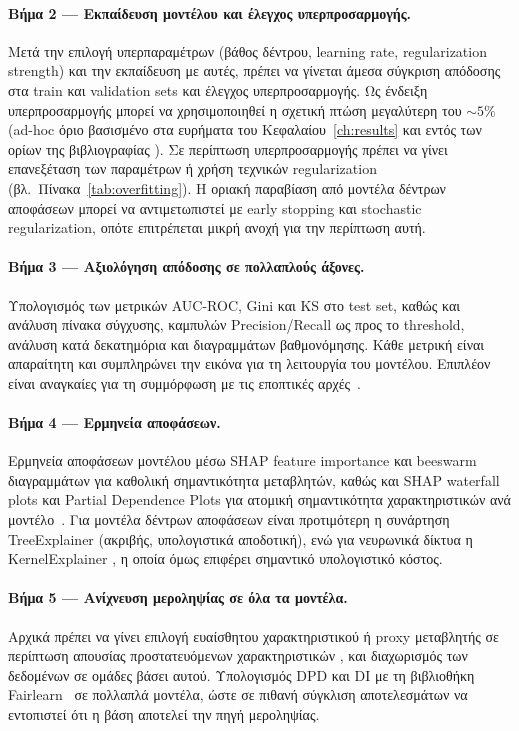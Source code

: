 \paragraph{Βήμα 2 --- Εκπαίδευση μοντέλου και έλεγχος υπερπροσαρμογής.}
Μετά την επιλογή υπερπαραμέτρων (βάθος δέντρου, learning
rate, regularization strength) και την εκπαίδευση με αυτές,
πρέπει να γίνεται άμεσα σύγκριση απόδοσης στα train και
validation sets και έλεγχος υπερπροσαρμογής. Ως ένδειξη
υπερπροσαρμογής μπορεί να χρησιμοποιηθεί η σχετική πτώση
μεγαλύτερη του ${\sim}5\%$ (ad-hoc όριο βασισμένο στα ευρήματα
του Κεφαλαίου~\ref{ch:results} και εντός των ορίων της βιβλιογραφίας \citep{cawley2010over}). 
Σε περίπτωση υπερπροσαρμογής
πρέπει να γίνει επανεξέταση των παραμέτρων ή χρήση τεχνικών
regularization (βλ.\ Πίνακα~\ref{tab:overfitting}). Η
οριακή παραβίαση από μοντέλα δέντρων αποφάσεων μπορεί να
αντιμετωπιστεί με early stopping και stochastic
regularization, οπότε επιτρέπεται μικρή ανοχή για την
περίπτωση αυτή.

\paragraph{Βήμα 3 --- Αξιολόγηση απόδοσης σε πολλαπλούς άξονες.}
Υπολογισμός των μετρικών AUC-ROC, Gini και KS στο test set,
καθώς και ανάλυση πίνακα σύγχυσης, καμπυλών Precision/Recall
ως προς το threshold, ανάλυση κατά δεκατημόρια και
διαγραμμάτων βαθμονόμησης. Κάθε μετρική είναι απαραίτητη
και συμπληρώνει την εικόνα για τη λειτουργία του μοντέλου.
Επιπλέον είναι αναγκαίες για τη συμμόρφωση με τις εποπτικές
αρχές~\citep{basel2017, sr117, eba2023}.

\paragraph{Βήμα 4 --- Ερμηνεία αποφάσεων.}
Ερμηνεία αποφάσεων μοντέλου μέσω SHAP feature importance και
beeswarm διαγραμμάτων για καθολική σημαντικότητα μεταβλητών,
καθώς και SHAP waterfall plots και Partial Dependence Plots
για ατομική σημαντικότητα χαρακτηριστικών ανά
μοντέλο~\citep{lundberg2017shap}. Για μοντέλα δέντρων
αποφάσεων είναι προτιμότερη η συνάρτηση TreeExplainer 
\citep{lundberg2020local} (ακριβής, υπολογιστικά αποδοτική), 
ενώ για νευρωνικά δίκτυα η KernelExplainer \citep{lundberg2017shap}, 
η οποία όμως επιφέρει σημαντικό υπολογιστικό κόστος.

\paragraph{Βήμα 5 --- Ανίχνευση μεροληψίας σε όλα τα μοντέλα.}
Αρχικά πρέπει να γίνει επιλογή ευαίσθητου χαρακτηριστικού ή 
proxy μεταβλητής σε περίπτωση απουσίας προστατευόμενων χαρακτηριστικών \citep{chen2019fairness},
και διαχωρισμός των δεδομένων σε ομάδες βάσει αυτού.
Υπολογισμός DPD και DI με τη βιβλιοθήκη
Fairlearn~\citep{bird2020fairlearn} σε πολλαπλά μοντέλα,
ώστε σε πιθανή σύγκλιση αποτελεσμάτων να εντοπιστεί ότι η
βάση αποτελεί την πηγή μεροληψίας.


